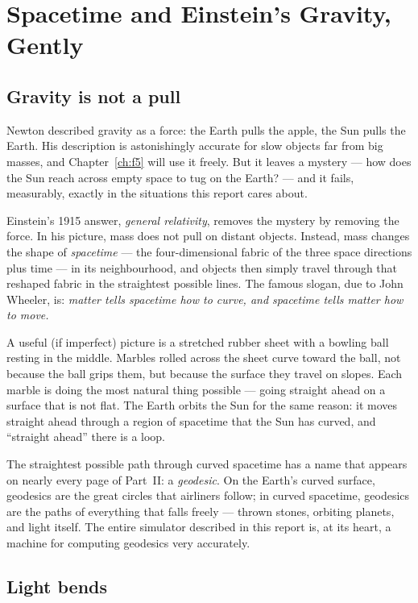 \chapter{Spacetime and Einstein's Gravity, Gently}
\label{ch:f2}

\section{Gravity is not a pull}

Newton described gravity as a force: the Earth pulls the apple, the Sun
pulls the Earth. His description is astonishingly accurate for slow
objects far from big masses, and Chapter~\ref{ch:f5} will use it freely.
But it leaves a mystery — how does the Sun reach across empty space to
tug on the Earth? — and it fails, measurably, exactly in the situations
this report cares about.

Einstein's 1915 answer, \emph{general relativity}, removes the mystery by
removing the force. In his picture, mass does not pull on distant objects.
Instead, mass changes the shape of \emph{spacetime} — the four-dimensional
fabric of the three space directions plus time — in its neighbourhood, and
objects then simply travel through that reshaped fabric in the straightest
possible lines. The famous slogan, due to John Wheeler, is: \emph{matter
tells spacetime how to curve, and spacetime tells matter how to move.}

A useful (if imperfect) picture is a stretched rubber sheet with a bowling
ball resting in the middle. Marbles rolled across the sheet curve toward
the ball, not because the ball grips them, but because the surface they
travel on slopes. Each marble is doing the most natural thing possible —
going straight ahead on a surface that is not flat. The Earth orbits the
Sun for the same reason: it moves straight ahead through a region of
spacetime that the Sun has curved, and ``straight ahead'' there is a loop.

The straightest possible path through curved spacetime has a name that
appears on nearly every page of Part~II: a \emph{geodesic}. On the Earth's
curved surface, geodesics are the great circles that airliners follow; in
curved spacetime, geodesics are the paths of everything that falls freely
— thrown stones, orbiting planets, and light itself. The entire simulator
described in this report is, at its heart, a machine for computing
geodesics very accurately.

\section{Light bends}

